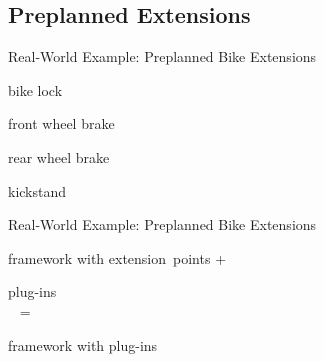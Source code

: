 \subsection{Preplanned Extensions}
\begin{frame}{Real-World Example: Preplanned Bike Extensions}
	\begin{fancycolumns}[columns=4,T]
		\centering{}

		bike lock
	\nextcolumn
		\centering{}

		front wheel brake
	\nextcolumn
		\centering{}

		rear wheel brake
	\nextcolumn
		\centering{}

		kickstand
	\end{fancycolumns}
\end{frame}

\begin{frame}{Real-World Example: Preplanned Bike Extensions}
	\begin{fancycolumns}[columns=5,widths={30,5,30,5,30}]
		\centering{}

		framework with extension~points
	\nextcolumn
		\centering\Huge +
	\nextcolumn
		\centering{}

		plug-ins\\~
	\nextcolumn
		\centering\Huge =
	\nextcolumn
		\centering{}

		framework with plug-ins\\~
	\end{fancycolumns}
\end{frame}

